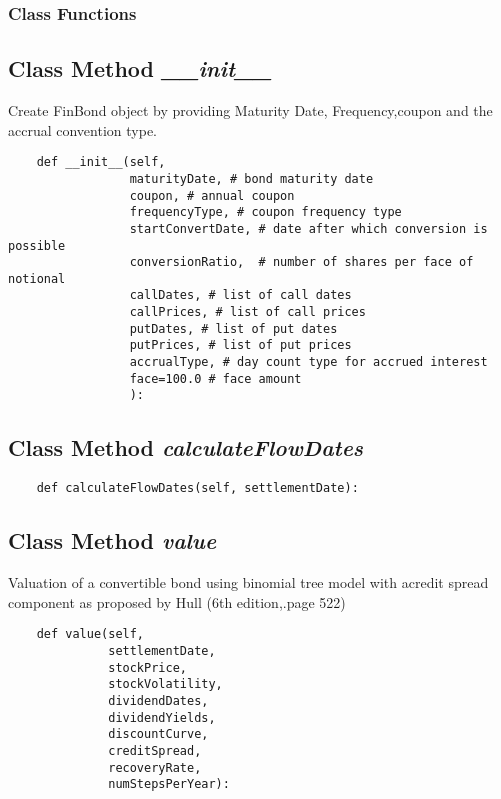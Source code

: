 \documentclass[twoside,11pt]{book}
\begin{document}
\subsubsection{Class Functions}

\subsection{Class Method {\it \_\_init\_\_}}
Create FinBond object by providing Maturity Date, Frequency,coupon and the accrual convention type. 

\begin{lstlisting}
    def __init__(self,
                 maturityDate, # bond maturity date
                 coupon, # annual coupon
                 frequencyType, # coupon frequency type
                 startConvertDate, # date after which conversion is possible
                 conversionRatio,  # number of shares per face of notional
                 callDates, # list of call dates
                 callPrices, # list of call prices
                 putDates, # list of put dates
                 putPrices, # list of put prices
                 accrualType, # day count type for accrued interest
                 face=100.0 # face amount
                 ):
\end{lstlisting}

\subsection{Class Method {\it calculateFlowDates}}


\begin{lstlisting}
    def calculateFlowDates(self, settlementDate):
\end{lstlisting}

\subsection{Class Method {\it value}}
Valuation of a convertible bond using binomial tree model with acredit spread component as proposed by Hull (6th edition,.page 522) 

\begin{lstlisting}
    def value(self,
              settlementDate,
              stockPrice,
              stockVolatility,
              dividendDates,
              dividendYields,
              discountCurve,
              creditSpread,
              recoveryRate,
              numStepsPerYear):
\end{lstlisting}
\end{document}
